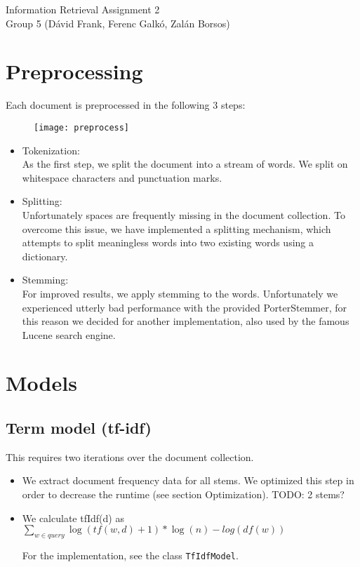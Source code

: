 \documentclass[12pt]{article}
\begin{document}
\begin{center}

{\Huge Information Retrieval Assignment 2} \\
\vspace{.5cm}
{\large Group 5 (Dávid Frank, Ferenc Galkó, Zalán Borsos)}
\end{center}

\vspace{1cm}

\section{Preprocessing}
Each document is preprocessed in the following 3 steps:
\begin{figure}[h]
\centering
\texttt{[image: preprocess]}
\end{figure}

\begin{itemize}
	\item Tokenization: \\
	As the first step, we split the document into a stream of words. We split on whitespace characters and punctuation marks.
	
	\item Splitting: \\
	Unfortunately spaces are frequently missing in the document collection. To overcome this issue, we have implemented a splitting mechanism, which attempts to split meaningless words into two existing words using a dictionary.
	\item Stemming: \\
	For improved results, we apply stemming to the words. Unfortunately we experienced utterly bad performance with the provided PorterStemmer, for this reason we decided for another implementation, also used by the famous Lucene search engine.
	
\end{itemize}


\section{Models}

\subsection{Term model (tf-idf)}
This requires two iterations over the document collection.
\begin{itemize}
	\item
	We extract document frequency data for all stems. We optimized this step in order to decrease the runtime (see section Optimization). TODO: 2 stems? 
	\item 
	We calculate tfIdf(d) as
	$\sum_{w\in query} \log(tf(w, d) + 1) * \log(n)-log(df(w))$
	
	For the implementation, see the class \texttt{TfIdfModel}.
\end{itemize}
\end{document}
